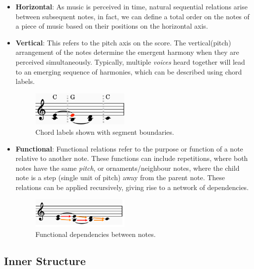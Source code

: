 \documentclass[12pt,a4paper,twoside,openright]{report}
\theoremstyle{definition}
\begin{document}
\begin{itemize}
  \item \textbf{Horizontal}: As music is perceived in time, natural sequential relations arise between subsequent notes, in fact, we can define a total order on the notes of a piece of music based on their positions on the horizontal axis.
  \item \textbf{Vertical}: This refers to the pitch axis on the score. The vertical(pitch) arrangement of the notes determine the emergent harmony when they are perceived simultaneously. Typically, multiple \textit{voices} heard together will lead to an emerging sequence of harmonies, which can be described using chord labels.

\begin{figure}[h]
  \centering
  \includegraphics[width=0.45\textwidth]{prep/cadenceharmony}
  \captionsetup{width=.9\linewidth}
  \caption{Chord labels shown with segment boundaries.}
  \label{fig:cadenceHarmony}
\end{figure}

  \item \textbf{Functional}: Functional relations refer to the purpose or function of a note relative to another note. These functions can include repetitions, where both notes have the same \textit{pitch}, or ornaments/neighbour notes, where the child note is a step (single unit of pitch) away from the parent note. These relations can be applied recursively, giving rise to a network of dependencies.

\begin{figure}[h]
  \centering
  \includegraphics[width=0.45\textwidth]{prep/cadencefunctions}
  \captionsetup{width=.9\linewidth}
  \caption{Functional dependencies between notes.}
  \label{fig:cadenceFunctions}
\end{figure}

\end{itemize}


\subsection{Inner Structure} %
\label{sub:Inner Structure}
\end{document}
